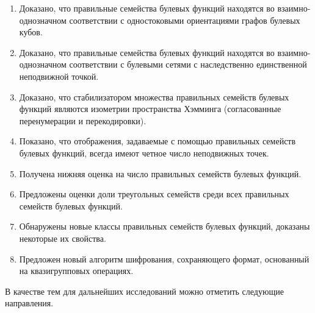 \begin{enumerate}
  \item Доказано, что правильные семейства булевых функций находятся во взаимно-однозначном соответствии с одностоковыми ориентациями графов булевых кубов.
  \item Доказано, что правильные семейства булевых функций находятся во взаимно-однозначном соответствии с булевыми сетями с наследственно единственной неподвижной точкой.
  \item Доказано, что стабилизатором множества правильных семейств булевых функций являются изометрии пространства Хэмминга (согласованные перенумерации и перекодировки).
  \item Показано, что отображения, задаваемые с помощью правильных семейств булевых функций, всегда имеют четное число неподвижных точек.
  \item Получена нижняя оценка на число правильных семейств булевых функций.
  \item Предложены оценки доли треугольных семейств среди всех правильных семейств булевых функций.
  \item Обнаружены новые классы правильных семейств булевых функций, доказаны некоторые их свойства.
  \item Предложен новый алгоритм шифрования, сохраняющего формат, основанный на квазигрупповых операциях.
\end{enumerate}

В качестве тем для дальнейших исследований можно отметить следующие направления.

